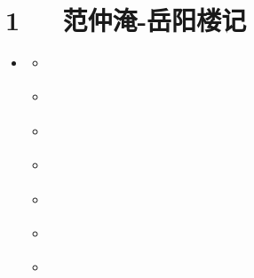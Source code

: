 \documentclass[letterpaper,10pt,english]{sphinxmanual}
\begin{document}
\chapter{1   范仲淹-岳阳楼记}
\label{\detokenize{p01_u6563_u6587/_u8303_u4ef2_u6df9-_u5cb3_u9633_u697c_u8bb0:id1}}\label{\detokenize{p01_u6563_u6587/_u8303_u4ef2_u6df9-_u5cb3_u9633_u697c_u8bb0::doc}}
\begin{sphinxShadowBox}
\begin{itemize}
\item {} 
\label{\detokenize{p01_u6563_u6587/_u8303_u4ef2_u6df9-_u5cb3_u9633_u697c_u8bb0:id10}}{\hyperref[\detokenize{p01_u6563_u6587/_u8303_u4ef2_u6df9-_u5cb3_u9633_u697c_u8bb0:id1}]{}}
\begin{itemize}
\item {} 
\label{\detokenize{p01_u6563_u6587/_u8303_u4ef2_u6df9-_u5cb3_u9633_u697c_u8bb0:id11}}{\hyperref[\detokenize{p01_u6563_u6587/_u8303_u4ef2_u6df9-_u5cb3_u9633_u697c_u8bb0:id3}]{}}

\item {} 
\label{\detokenize{p01_u6563_u6587/_u8303_u4ef2_u6df9-_u5cb3_u9633_u697c_u8bb0:id12}}{\hyperref[\detokenize{p01_u6563_u6587/_u8303_u4ef2_u6df9-_u5cb3_u9633_u697c_u8bb0:id4}]{}}

\item {} 
\label{\detokenize{p01_u6563_u6587/_u8303_u4ef2_u6df9-_u5cb3_u9633_u697c_u8bb0:id13}}{\hyperref[\detokenize{p01_u6563_u6587/_u8303_u4ef2_u6df9-_u5cb3_u9633_u697c_u8bb0:id5}]{}}

\item {} 
\label{\detokenize{p01_u6563_u6587/_u8303_u4ef2_u6df9-_u5cb3_u9633_u697c_u8bb0:id14}}{\hyperref[\detokenize{p01_u6563_u6587/_u8303_u4ef2_u6df9-_u5cb3_u9633_u697c_u8bb0:id6}]{}}

\item {} 
\label{\detokenize{p01_u6563_u6587/_u8303_u4ef2_u6df9-_u5cb3_u9633_u697c_u8bb0:id15}}{\hyperref[\detokenize{p01_u6563_u6587/_u8303_u4ef2_u6df9-_u5cb3_u9633_u697c_u8bb0:id7}]{}}

\item {} 
\label{\detokenize{p01_u6563_u6587/_u8303_u4ef2_u6df9-_u5cb3_u9633_u697c_u8bb0:id16}}{\hyperref[\detokenize{p01_u6563_u6587/_u8303_u4ef2_u6df9-_u5cb3_u9633_u697c_u8bb0:id8}]{}}

\item {} 
\label{\detokenize{p01_u6563_u6587/_u8303_u4ef2_u6df9-_u5cb3_u9633_u697c_u8bb0:id17}}{\hyperref[\detokenize{p01_u6563_u6587/_u8303_u4ef2_u6df9-_u5cb3_u9633_u697c_u8bb0:id9}]{}}

\end{itemize}

\end{itemize}
\end{sphinxShadowBox}
\end{document}
